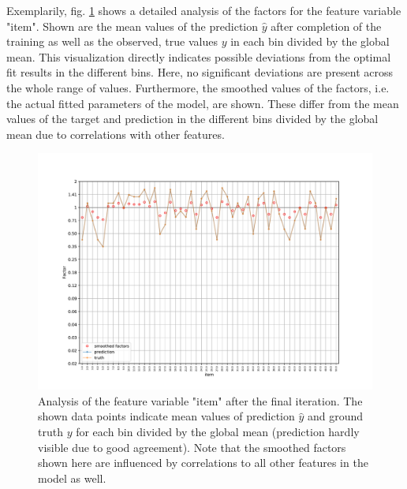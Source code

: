 \documentclass[BCOR=1mm, DIV=calc,10pt,
twoside=true,
twocolumn,
headings=normal]{scrartcl}
\begin{document}
Exemplarily, fig. \ref{fig:item} shows a detailed analysis of the factors for the feature
variable "item". Shown are the mean values of the prediction $\hat{y}$ after completion of
the training as well as the observed, true values $y$ in each bin divided by the global
mean. This visualization directly indicates possible deviations from the optimal fit
results in the different bins. Here, no significant deviations are present across the
whole range of values. Furthermore, the smoothed values of the factors, i.e. the actual
fitted parameters of the model, are shown. These differ from the mean values of the target
and prediction in the different bins divided by the global mean due to correlations with
other features.

\begin{figure}
\begin{center}
\includegraphics[scale=0.3]{item}
\caption{\label{fig:item} Analysis of the feature variable "item" after the final
iteration. The shown data points indicate mean values of prediction $\hat{y}$ and ground
truth $y$ for each bin divided by the global mean (prediction hardly visible due to good
agreement). Note that the smoothed factors shown here are influenced by correlations to
all other features in the model as well.}
\end{center}
\end{figure}
\end{document}
